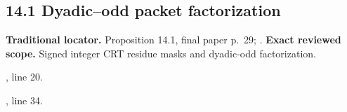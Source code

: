 \subsection{14.1 Dyadic–odd packet factorization}
\label{result:14.1}
\textbf{Traditional locator.} Proposition 14.1, final paper p.~29; .
\textbf{Exact reviewed scope.} Signed integer CRT residue masks and dyadic-odd factorization.
{\small{}\par}
{\footnotesize\color{muted}, line 20.\par}\smallskip
{\small{}\par}
{\footnotesize\color{muted}, line 34.\par}\smallskip
